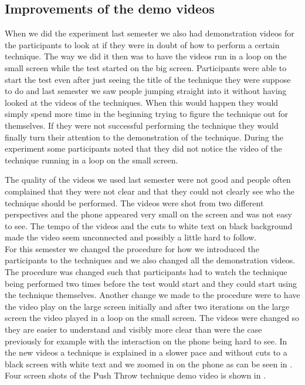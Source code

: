 \subsection*{Improvements of the demo videos}\label{sec:videoslastsemester}
When we did the experiment last semester we also had demonstration videos for the participants to look at if they were in doubt of how to perform a certain technique.
The way we did it then was to have the videos run in a loop on the small screen while the test started on the big screen.
Participants were able to start the test even after just seeing the title of the technique they were suppose to do and last semester we saw people jumping straight into it without having looked at the videos of the techniques. 
When this would happen they would simply spend more time in the beginning trying to figure the technique out for themselves.
If they were not successful performing the technique they would finally turn their attention to the demonstration of the technique.
During the experiment some participants noted that they did not notice the video of the technique running in a loop on the small screen.

The quality of the videos we used last semester were not good and people often complained that they were not clear and that they could not clearly see who the technique should be performed.
The videos were shot from two different perspectives and the phone appeared very small on the screen and was not easy to see.
The tempo of the videos and the cuts to white text on black background made the video seem unconnected and possibly a little hard to follow.\\

For this semester we changed the procedure for how we introduced the participants to the techniques and we also changed all the demonstration videos.
The procedure was changed such that participants had to watch the technique being performed two times before the test would start and they could start using the technique themselves.
Another change we made to the procedure were to have the video play on the large screen initially and after two iterations on the large screen the video played in a loop on the small screen.
The videos were changed so they are easier to understand and visibly more clear than were the case previously for example with the interaction on the phone being hard to see.
In the new videos a technique is explained in a slower pace and without cuts to a black screen with white text and we zoomed in on the phone as can be seen in .
Four screen shots of the Push Throw technique demo video is shown in .

